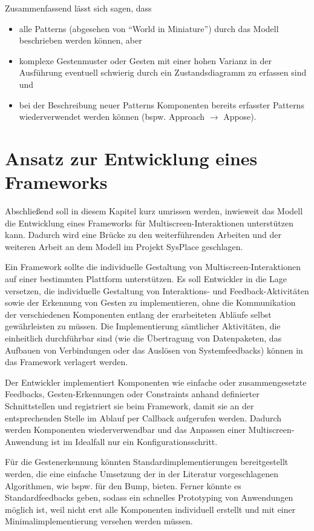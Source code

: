 Zusammenfassend lässt sich sagen, dass
\begin{itemize}
\item alle Patterns (abgesehen von "`World in Miniature"') durch das Modell beschrieben werden können, aber
\item komplexe Gestenmuster oder Gesten mit einer hohen Varianz in der Ausführung eventuell schwierig durch ein Zustandsdiagramm zu erfassen sind und
\item bei der Beschreibung neuer Patterns Komponenten bereits erfasster Patterns wiederverwendet werden können (bspw. Approach \(\rightarrow\) Appose).
\end{itemize}

\section{Ansatz zur Entwicklung eines Frameworks}
\label{sec:framework}
Abschließend soll in diesem Kapitel kurz umrissen werden, inwieweit das Modell die Entwicklung eines Frameworks für Multiscreen-Interaktionen unterstützen kann. Dadurch wird eine Brücke zu den weiterführenden Arbeiten und der weiteren Arbeit an dem Modell im Projekt SysPlace geschlagen.

Ein Framework sollte die individuelle Gestaltung von Multiscreen-Interaktionen auf einer bestimmten Plattform unterstützen. Es soll Entwickler in die Lage versetzen,  die individuelle Gestaltung von Interaktions- und Feedback-Aktivitäten sowie der Erkennung von Gesten zu implementieren, ohne die Kommunikation der verschiedenen Komponenten entlang der erarbeiteten Abläufe selbst gewährleisten zu müssen. Die Implementierung sämtlicher Aktivitäten, die einheitlich durchführbar sind (wie \zb die Übertragung von Datenpaketen, das Aufbauen von Verbindungen oder das Auslösen von Systemfeedbacks) können in das Framework verlagert werden.

Der Entwickler implementiert Komponenten wie \zb einfache oder zusammengesetzte Feedbacks, Gesten-Erkennungen oder Constraints anhand definierter Schnittstellen und registriert sie beim Framework, damit sie an der entsprechenden Stelle im Ablauf per Callback aufgerufen werden. Dadurch werden Komponenten wiederverwendbar und das Anpassen einer Multiscreen-Anwendung ist im Idealfall nur ein Konfigurationsschritt.

Für die Gestenerkennung könnten Standardimplementierungen bereitgestellt werden, die eine einfache Umsetzung der in der Literatur vorgeschlagenen Algorithmen, wie bspw. für den Bump, bieten. Ferner könnte es Standardfeedbacks geben, sodass ein schnelles Prototyping von Anwendungen möglich ist, weil nicht erst alle Komponenten individuell erstellt und mit einer Minimalimplementierung versehen werden müssen.

